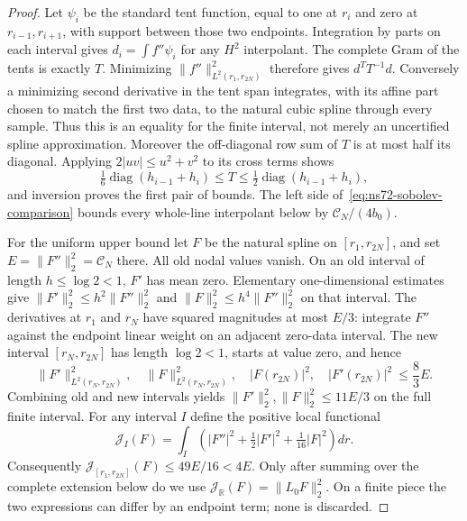 \begin{proof}
Let $\psi_i$ be the standard tent function, equal to one at $r_i$
and zero at $r_{i-1},r_{i+1}$, with support between those two endpoints.
Integration by parts on each interval gives
$d_i=\int f''\psi_i$ for any $H^2$ interpolant. The complete Gram of
the tents is exactly $T$. Minimizing $\|f''\|_{L^2(r_1,r_{2N})}^2$
therefore gives $d^TT^{-1}d$. Conversely a minimizing second derivative
in the tent span integrates, with its affine part chosen to match the
first two data, to the natural cubic spline through every sample.
Thus this is an equality for the finite interval, not merely an
uncertified spline approximation. Moreover the off-diagonal row sum
of $T$ is at most half its diagonal. Applying
$2|uv|\leq u^2+v^2$ to its cross terms shows
\[
 \tfrac16\operatorname{diag}(h_{i-1}+h_i)
 \leq T\leq\tfrac12\operatorname{diag}(h_{i-1}+h_i),
\]
and inversion proves the first pair of bounds.
The left side of~\eqref{eq:ns72-sobolev-comparison} bounds every
whole-line interpolant below by $\mathcal C_N/(4b_0)$.

For the uniform upper bound let $F$ be the natural spline on
$[r_1,r_{2N}]$, and set $E=\|F''\|_2^2=\mathcal C_N$ there.
All old nodal values vanish. On an old interval of length $h\leq\log2<1$,
$F'$ has mean zero. Elementary one-dimensional estimates give
$\|F'\|_2^2\leq h^2\|F''\|_2^2$ and
$\|F\|_2^2\leq h^4\|F''\|_2^2$ on that interval.
The derivatives at $r_1$ and $r_N$ have squared magnitudes at most
$E/3$: integrate $F''$ against the endpoint linear weight on an
adjacent zero-data interval. The new interval $[r_N,r_{2N}]$ has
length $\log2<1$, starts at value zero, and hence
\[
 \|F'\|_{L^2(r_N,r_{2N})}^2,\quad
 \|F\|_{L^2(r_N,r_{2N})}^2,\quad
 |F(r_{2N})|^2,\quad |F'(r_{2N})|^2\ \leq\frac83 E.
\]
Combining old and new intervals yields
$\|F'\|_2^2,\|F\|_2^2\leq11E/3$ on the full finite interval.
For any interval $I$ define the positive local functional
\[
 \mathcal J_I(F)=\int_I\left(|F''|^2+\tfrac12|F'|^2
                                      +\tfrac1{16}|F|^2\right)dr.
\]
Consequently $\mathcal J_{[r_1,r_{2N}]}(F)\leq49E/16<4E$.
Only after summing over the complete extension below do we use
$\mathcal J_{\mathbb R}(F)=\|L_0F\|_2^2$. On a finite piece the
two expressions can differ by an endpoint term; none is discarded.


\end{proof}
